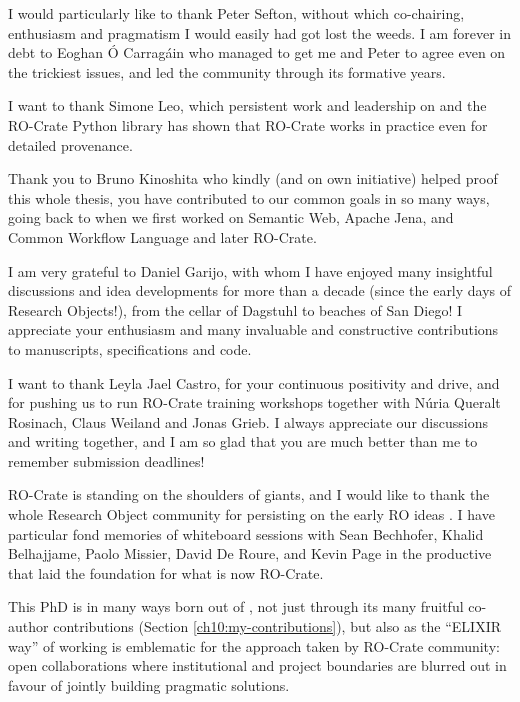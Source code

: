 I would particularly like to thank Peter Sefton, without which co-chairing, enthusiasm and pragmatism I would easily had got lost the weeds.  I am forever in debt to Eoghan Ó Carragáin who managed to get me and Peter to agree even on the trickiest issues, and led the community through its formative years.

I want to thank Simone Leo, which persistent work and leadership on  and the RO-Crate Python library \cite{De Geest 2023a} has shown that RO-Crate works in practice even for detailed provenance. 

Thank you to Bruno Kinoshita who kindly (and on own initiative) helped proof this whole thesis, you have contributed to our common goals in so many ways, going back to when we first worked on Semantic Web, Apache Jena, and Common Workflow Language and later RO-Crate.

I am very grateful to Daniel Garijo, with whom I have enjoyed many insightful discussions and idea developments for more than a decade (since the early days of Research Objects!), from the cellar of Dagstuhl to beaches of San Diego! I appreciate your enthusiasm and many invaluable and constructive contributions to manuscripts, specifications and code.

I want to thank Leyla Jael Castro, for your continuous positivity and drive, and for pushing us to run RO-Crate training workshops together with Núria Queralt Rosinach, Claus Weiland and Jonas Grieb. I always appreciate our discussions and writing together, and I am so glad that you are much better than me to remember submission deadlines!

RO-Crate is standing on the shoulders of giants, and I would like to thank the whole Research Object community \cite{Goble 2018} for persisting on the early RO ideas \cite{Newman 2009,Bechhofer 2013}. I have particular fond memories of whiteboard sessions with Sean Bechhofer, Khalid Belhajjame, Paolo Missier, David De Roure, and Kevin Page in the productive  that laid the foundation for what is now RO-Crate.

This PhD is in many ways born out of 
, not just 
through its many fruitful co-author contributions 
(Section \vref{ch10:my-contributions}), 
but also as the ``ELIXIR way'' of working is emblematic for the approach taken by RO-Crate community: open collaborations where institutional and project boundaries are blurred out in favour of jointly building pragmatic solutions.

